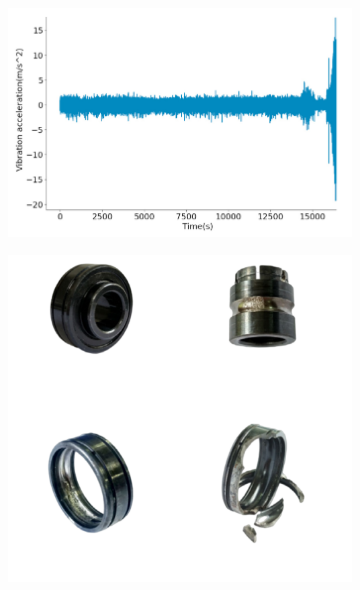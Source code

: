 \documentclass[xcolor=dvipsnames, professionalfonts, aspectratio=169, 11pt]{beamer}
\begin{document}
\begin{persian}
\begin{frame}
	\begin{figure}
		\centering
		\begin{subfigure}[b]{0.4\textwidth}
			\centering
			\includegraphics[width=\textwidth]{img/img1.png}
		\end{subfigure}
		\hspace{0cm}
		\begin{subfigure}[b]{0.3\textwidth}
			\centering
			\includegraphics[width=\textwidth]{img/img2.png}
		\end{subfigure}
		\hspace{0cm}
	\end{figure}
\end{frame}









\end{persian}
\end{document}
